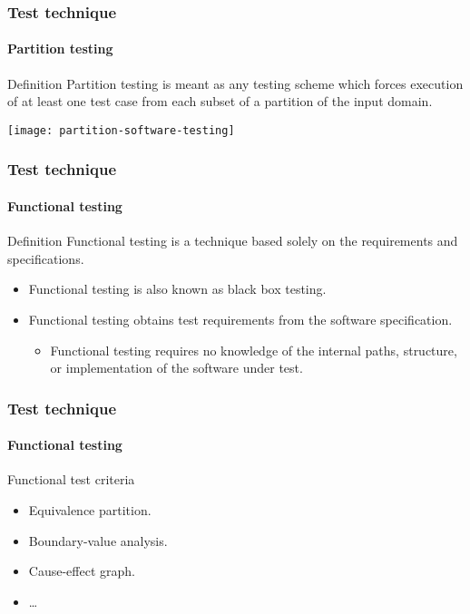 \begin{frame}
\frametitle{Test technique}
\framesubtitle{Partition testing}
\label{concept:partition-testing}

\begin{block:concept}{Definition}
Partition testing is meant as any testing scheme which forces execution
of at least one test case from each subset of a partition of the input
domain.
\end{block:concept}

\begin{block:fact}{}
    \centering
    \texttt{[image: partition-software-testing]}
\end{block:fact}
\end{frame}



\begin{frame}
\frametitle{Test technique}
\framesubtitle{Functional testing}
\label{concept:functional-testing}

\begin{block:concept}{Definition}
Functional testing is a technique based solely on the requirements and
specifications.
\end{block:concept}

\begin{block:fact}{}
\begin{itemize}
	\item Functional testing is also known as black box testing.

	\item Functional testing obtains test requirements from the
	software specification.
	\begin{itemize}
		\item Functional testing requires no knowledge of the internal paths,
		structure, or implementation of the software under test.
	\end{itemize}
\end{itemize}
\end{block:fact}

\hfill
{}
\end{frame}


\begin{frame}
\frametitle{Test technique}
\framesubtitle{Functional testing}

\begin{block:fact}{Functional test criteria}
\begin{itemize}
	\item Equivalence partition.
	\item Boundary-value analysis.
	\item Cause-effect graph.
	\item \ldots
\end{itemize}
\end{block:fact}
\end{frame}



